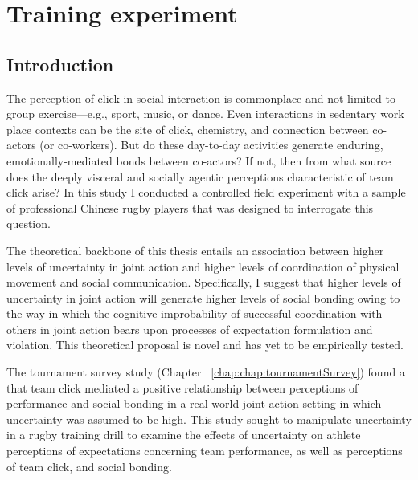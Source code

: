 

\begin{savequote}[8cm]

  \qauthor{}
\end{savequote}



\chapter{\label{chap:trainingExperiment}Training experiment}

\minitoc


\section{Introduction}
The perception of click in social interaction is commonplace and not limited to group exercise---e.g., sport, music, or dance.  Even interactions in sedentary work place contexts can be the site of click, chemistry, and connection between co-actors (or co-workers).   But do these day-to-day activities generate enduring, emotionally-mediated bonds between co-actors?  If not, then from what source does the deeply visceral and socially agentic perceptions characteristic of team click arise? In this study I conducted a controlled field experiment with a sample of professional Chinese rugby players that was designed to interrogate this question.

The theoretical backbone of this thesis entails an association between higher levels of uncertainty in joint action and higher levels of coordination of physical movement and social communication.  Specifically, I suggest that higher levels of uncertainty in joint action will generate higher levels of social bonding owing to the way in which the cognitive improbability of successful coordination with others in joint action bears upon processes of expectation formulation and violation.  This theoretical proposal is novel and has yet to be empirically tested.

The tournament survey study (Chapter ~\ref{chap:chap:tournamentSurvey}) found a that team click mediated a positive relationship between perceptions of performance and social bonding in a real-world joint action setting in which uncertainty was assumed to be high.  This study sought to manipulate uncertainty in a rugby training drill to examine the effects of uncertainty on athlete perceptions of expectations concerning team performance, as well as perceptions of team click, and social bonding.

